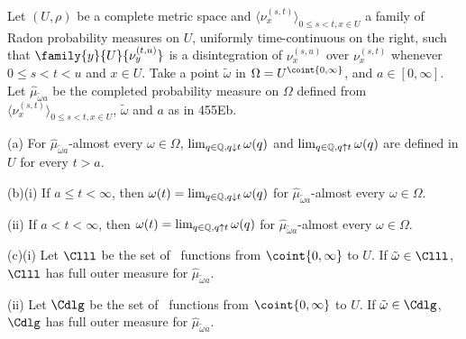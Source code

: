  Let $(U,\rho)$ be a complete metric
space and $\langle\nu^{(s,t)}_x\rangle_{0\le s<t,x\in U}$ a family of
Radon probability measures on $U$, uniformly time-continuous on the right,
such that $\family{y}{U}{\nu_y^{(t,u)}}$ is a disintegration of
$\nu_x^{(s,u)}$ over $\nu_x^{(s,t)}$ whenever $0\le s<t<u$ and $x\in U$.
Take a point $\tilde\omega$ in $\Omega=U^{\coint{0,\infty}}$, and
$a\in[0,\infty]$.   Let $\hat\mu_{\tilde\omega a}$ be the completed
probability measure on $\Omega$ defined from
$\langle\nu^{(s,t)}_x\rangle_{0\le s<t,x\in U}$, $\tilde\omega$ and $a$
as in 455Eb.

(a) For $\hat\mu_{\tilde\omega a}$-almost every $\omega\in\Omega$,
$\lim_{q\in\Bbb Q,q\downarrow t}\omega(q)$ and
$\lim_{q\in\Bbb Q,q\uparrow t}\omega(q)$ are defined in $U$ for every
$t>a$.

(b)(i) If $a\le t<\infty$, then
$\omega(t)=\lim_{q\in\Bbb Q,q\downarrow t}\omega(q)$
for $\hat\mu_{\tilde\omega a}$-almost every $\omega\in\Omega$.

\quad(ii) If $a<t<\infty$, then
$\omega(t)=\lim_{q\in\Bbb Q,q\uparrow t}\omega(q)$
for $\hat\mu_{\tilde\omega a}$-almost every $\omega\in\Omega$.

(c)(i) Let $\Clll$ be the set of \callal\ functions from
$\coint{0,\infty}$ to $U$.
If $\tilde\omega\in\Clll$,
$\Clll$ has full outer measure for $\hat\mu_{\tilde\omega a}$.

\quad(ii) Let $\Cdlg$ be the set of \cadlag\ functions from
$\coint{0,\infty}$ to $U$.   If $\tilde\omega\in\Cdlg$,
$\Cdlg$ has full outer measure for $\hat\mu_{\tilde\omega a}$.


